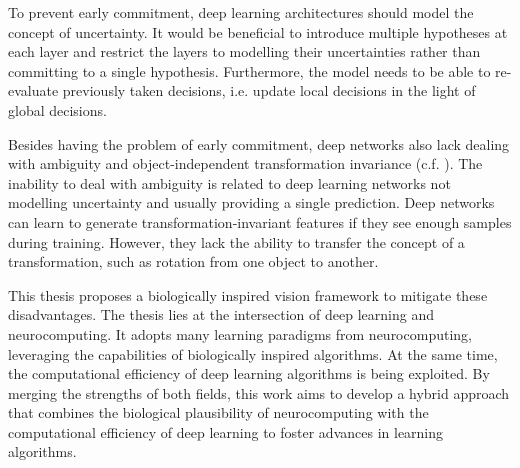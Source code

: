 To prevent early commitment, deep learning architectures should model the concept of uncertainty. It would be beneficial to introduce multiple hypotheses at each layer and restrict the layers to modelling their uncertainties rather than committing to a single hypothesis. Furthermore, the model needs to be able to re-evaluate previously taken decisions, i.e. update local decisions in the light of global decisions.

Besides having the problem of early commitment, deep networks also lack dealing with ambiguity and object-independent transformation invariance (c.f. ).
The inability to deal with ambiguity is related to deep learning networks not modelling uncertainty and usually providing a single prediction.
Deep networks can learn to generate transformation-invariant features if they see enough samples during training.
However, they lack the ability to transfer the concept of a transformation, such as rotation from one object to another.

This thesis proposes a biologically inspired vision framework to mitigate these disadvantages. 
The thesis lies at the intersection of deep learning and neurocomputing. It adopts many learning paradigms from neurocomputing, leveraging the capabilities of biologically inspired algorithms. At the same time, the computational efficiency of deep learning algorithms is being exploited. By merging the strengths of both fields, this work aims to develop a hybrid approach that combines the biological plausibility of neurocomputing with the computational efficiency of deep learning to foster advances in learning algorithms.


